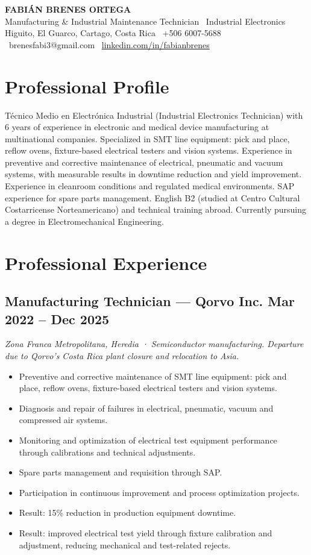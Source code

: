 \documentclass[10.5pt]{article}
\begin{document}
\begin{center}
{\Huge \textbf{FABIÁN BRENES ORTEGA}} \\[3pt]
{\large Manufacturing \& Industrial Maintenance Technician \textbar\ Industrial Electronics} \\[3pt]
{\small \color{midgray} Higuito, El Guarco, Cartago, Costa Rica \textbar\ +506 6007-5688 \textbar\ brenesfabi3@gmail.com \textbar\ \href{https://linkedin.com/in/fabianbrenes}{linkedin.com/in/fabianbrenes}}
\end{center}

\section*{Professional Profile}
Técnico Medio en Electrónica Industrial (Industrial Electronics Technician) with 6 years of experience in electronic and medical device manufacturing at multinational companies. Specialized in SMT line equipment: pick and place, reflow ovens, fixture-based electrical testers and vision systems. Experience in preventive and corrective maintenance of electrical, pneumatic and vacuum systems, with measurable results in downtime reduction and yield improvement. Experience in cleanroom conditions and regulated medical environments. SAP experience for spare parts management. English B2 (studied at Centro Cultural Costarricense Norteamericano) and technical training abroad. Currently pursuing a degree in Electromechanical Engineering.

\section*{Professional Experience}

\subsection*{Manufacturing Technician --- Qorvo Inc. \hfill Mar 2022 -- Dec 2025}
\textit{Zona Franca Metropolitana, Heredia · Semiconductor manufacturing. Departure due to Qorvo's Costa Rica plant closure and relocation to Asia.}
\begin{itemize}
\item Preventive and corrective maintenance of SMT line equipment: pick and place, reflow ovens, fixture-based electrical testers and vision systems.
\item Diagnosis and repair of failures in electrical, pneumatic, vacuum and compressed air systems.
\item Monitoring and optimization of electrical test equipment performance through calibrations and technical adjustments.
\item Spare parts management and requisition through SAP.
\item Participation in continuous improvement and process optimization projects.
\item Result: 15\% reduction in production equipment downtime.
\item Result: improved electrical test yield through fixture calibration and adjustment, reducing mechanical and test-related rejects.
\end{itemize}
\end{document}
